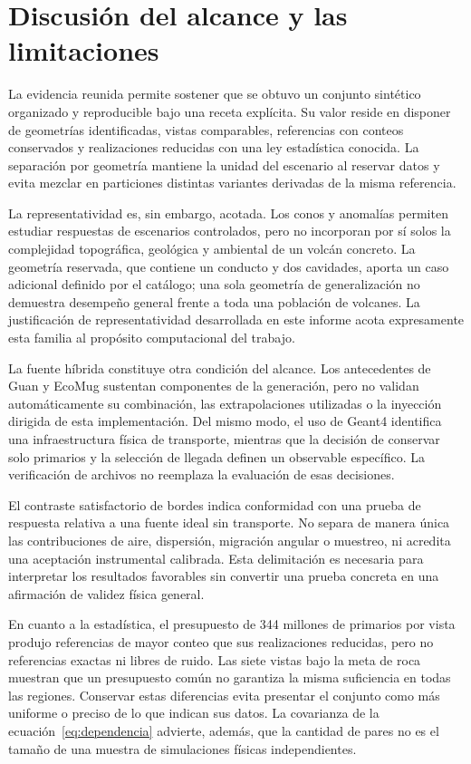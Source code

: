 \documentclass[11pt,a4paper]{article}
\begin{document}
\section{Discusión del alcance y las limitaciones}

La evidencia reunida permite sostener que se obtuvo un conjunto sintético organizado y reproducible bajo una receta explícita. Su valor reside en disponer de geometrías identificadas, vistas comparables, referencias con conteos conservados y realizaciones reducidas con una ley estadística conocida. La separación por geometría mantiene la unidad del escenario al reservar datos y evita mezclar en particiones distintas variantes derivadas de la misma referencia.

La representatividad es, sin embargo, acotada. Los conos y anomalías permiten estudiar respuestas de escenarios controlados, pero no incorporan por sí solos la complejidad topográfica, geológica y ambiental de un volcán concreto. La geometría reservada, que contiene un conducto y dos cavidades, aporta un caso adicional definido por el catálogo; una sola geometría de generalización no demuestra desempeño general frente a toda una población de volcanes. La justificación de representatividad desarrollada en este informe acota expresamente esta familia al propósito computacional del trabajo.

La fuente híbrida constituye otra condición del alcance. Los antecedentes de Guan y EcoMug sustentan componentes de la generación, pero no validan automáticamente su combinación, las extrapolaciones utilizadas o la inyección dirigida de esta implementación. Del mismo modo, el uso de Geant4 identifica una infraestructura física de transporte, mientras que la decisión de conservar solo primarios y la selección de llegada definen un observable específico. La verificación de archivos no reemplaza la evaluación de esas decisiones.

El contraste satisfactorio de bordes indica conformidad con una prueba de respuesta relativa a una fuente ideal sin transporte. No separa de manera única las contribuciones de aire, dispersión, migración angular o muestreo, ni acredita una aceptación instrumental calibrada. Esta delimitación es necesaria para interpretar los resultados favorables sin convertir una prueba concreta en una afirmación de validez física general.

En cuanto a la estadística, el presupuesto de 344 millones de primarios por vista produjo referencias de mayor conteo que sus realizaciones reducidas, pero no referencias exactas ni libres de ruido. Las siete vistas bajo la meta de roca muestran que un presupuesto común no garantiza la misma suficiencia en todas las regiones. Conservar estas diferencias evita presentar el conjunto como más uniforme o preciso de lo que indican sus datos. La covarianza de la ecuación~\eqref{eq:dependencia} advierte, además, que la cantidad de pares no es el tamaño de una muestra de simulaciones físicas independientes.
\end{document}
